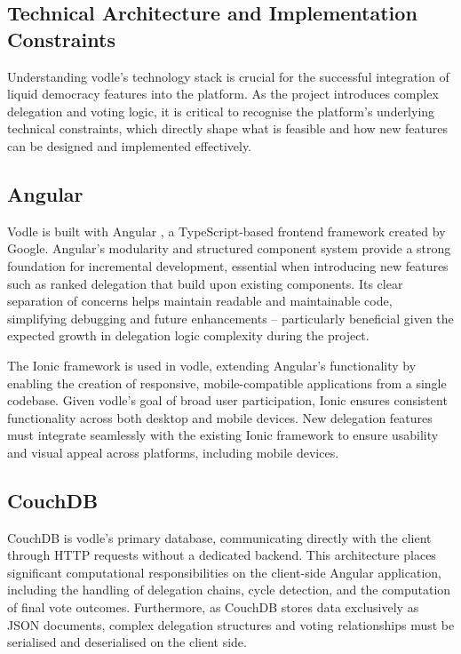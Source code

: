 \subsection{Technical Architecture and Implementation Constraints}
Understanding vodle's technology stack is crucial for the successful integration of liquid democracy features into the platform. As the project introduces complex delegation and voting logic, it is critical to recognise the platform's underlying technical constraints, which directly shape what is feasible and how new features can be designed and implemented effectively.

\subsection*{Angular}
Vodle is built with Angular \citep{angular}, a TypeScript-based frontend framework created by Google. Angular's modularity and structured component system provide a strong foundation for incremental development, essential when introducing new features such as ranked delegation that build upon existing components. Its clear separation of concerns helps maintain readable and maintainable code, simplifying debugging and future enhancements -- particularly beneficial given the expected growth in delegation logic complexity during the project.

The Ionic \citep{ionic} framework is used in vodle, extending Angular's functionality by enabling the creation of responsive, mobile-compatible applications from a single codebase. Given vodle's goal of broad user participation, Ionic ensures consistent functionality across both desktop and mobile devices. %
New delegation features must integrate seamlessly with the existing Ionic framework to ensure usability and visual appeal across platforms, including mobile devices.

\subsection*{CouchDB}
CouchDB \citep{couchdb} is vodle's primary database, communicating directly with the client through HTTP requests without a dedicated backend. This architecture places significant computational responsibilities on the client-side Angular application, including the handling of delegation chains, cycle detection, and the computation of final vote outcomes. Furthermore, as CouchDB stores data exclusively as JSON documents, complex delegation structures and voting relationships must be serialised and deserialised on the client side.

